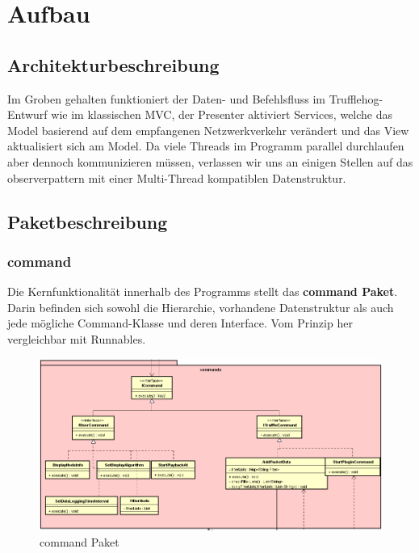 \chapter{Aufbau \programname}

\section{Architekturbeschreibung}
Im Groben gehalten funktioniert der Daten- und Befehlsfluss im Trufflehog-Entwurf
wie im klassischen MVC, der Presenter aktiviert Services, welche das Model basierend
auf dem empfangenen Netzwerkverkehr verändert und das View aktualisiert sich am Model.
Da viele Threads im Programm parallel durchlaufen aber dennoch kommunizieren müssen,
verlassen wir uns an einigen Stellen auf das \gls{observerpattern} mit einer
Multi-Thread kompatiblen Datenstruktur.\newline
\newline

\section{Paketbeschreibung}

\subsection{command}

Die Kernfunktionalität innerhalb des Programms stellt das \textbf{command Paket}.
Darin befinden sich sowohl die Hierarchie, vorhandene Datenstruktur als auch jede
mögliche Command-Klasse und deren Interface. Vom Prinzip her vergleichbar mit
Runnables.\newline

\begin{figure}[H]
  \centering
  \includegraphics[width=\textwidth]{../diagramimages/commands.png}
  \caption{command Paket}
\end{figure}

